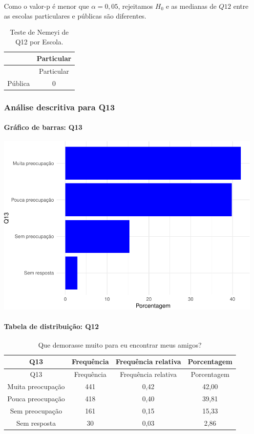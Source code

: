 \documentclass[]{article}
\let\oldparagraph\paragraph
\renewcommand{\paragraph}[1]{\oldparagraph{#1}\mbox{}}
\begin{document}
Como o valor-p é menor que \(\alpha=0,05\), rejeitamos \(H_0\) e as medianas de \(Q12\) entre as escolas particulares e públicas são diferentes.

\begin{longtable}[]{@{}lc@{}}
\caption{\label{tab:unnamed-chunk-51}Teste de Nemeyi de Q12 por Escola.}\tabularnewline
\toprule
& Particular\tabularnewline
\midrule
\endfirsthead
\toprule
& Particular\tabularnewline
\midrule
\endhead
Pública & 0\tabularnewline
\bottomrule
\end{longtable}

\cleardoublepage

\hypertarget{anuxe1lise-descritiva-para-q13}{%
\subsubsection{Análise descritiva para Q13}\label{anuxe1lise-descritiva-para-q13}}

\hypertarget{gruxe1fico-de-barras-q13}{%
\paragraph{Gráfico de barras: Q13}\label{gruxe1fico-de-barras-q13}}

\begin{center}\includegraphics[width=0.75\linewidth]{relatorio_files/figure-latex/unnamed-chunk-52-1} \end{center}

\hypertarget{tabela-de-distribuiuxe7uxe3o-q12-1}{%
\paragraph{Tabela de distribuição: Q12}\label{tabela-de-distribuiuxe7uxe3o-q12-1}}

\begin{longtable}[]{@{}cccc@{}}
\caption{\label{tab:unnamed-chunk-53}Que demorasse muito para eu encontrar meus amigos?}\tabularnewline
\toprule
Q13 & Frequência & Frequência relativa & Porcentagem\tabularnewline
\midrule
\endfirsthead
\toprule
Q13 & Frequência & Frequência relativa & Porcentagem\tabularnewline
\midrule
\endhead
Muita preocupação & 441 & 0,42 & 42,00\tabularnewline
Pouca preocupação & 418 & 0,40 & 39,81\tabularnewline
Sem preocupação & 161 & 0,15 & 15,33\tabularnewline
Sem resposta & 30 & 0,03 & 2,86\tabularnewline
\bottomrule
\end{longtable}
\end{document}
